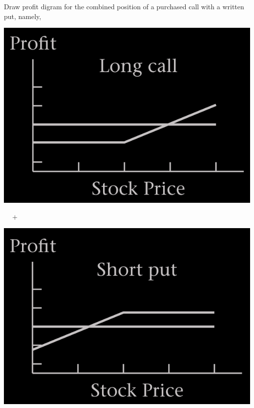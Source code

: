 \begin{frame}[fragile,t]
\begin{myexample}
	Draw profit digram for the combined position of a purchased call with a written put, namely,
	\begin{center}
		\begin{minipage}{0.3\textwidth}
			\includegraphics[scale=0.15]{figs/Long-call.png}
		\end{minipage}
		 $ \quad + \quad $
		\begin{minipage}{0.3\textwidth}
			\includegraphics[scale=0.15]{figs/Short-put.png}
		\end{minipage}
	\end{center}
\end{myexample}
\end{frame}
